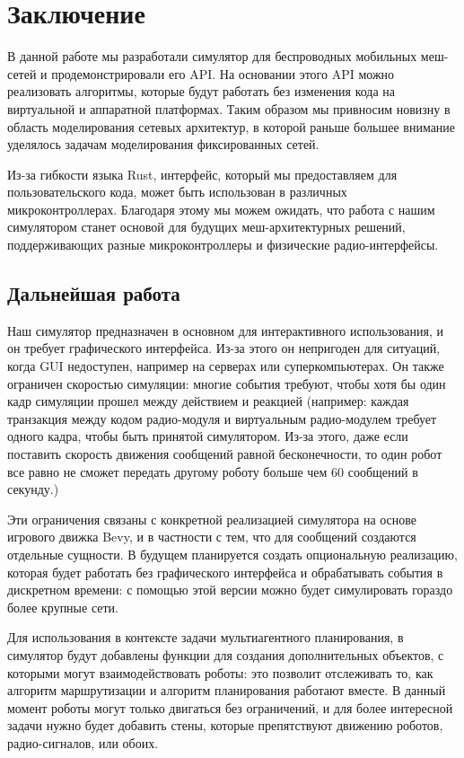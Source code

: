 \documentclass[%
]{report}
\begin{document}
\chapter{Заключение}

В данной работе мы разработали симулятор для беспроводных мобильных меш-сетей
и продемонстрировали его API.
На основании этого API можно реализовать алгоритмы, которые будут
работать без изменения кода на виртуальной и аппаратной платформах.
Таким образом мы привносим новизну в область моделирования сетевых архитектур,
в которой раньше большее внимание уделялось задачам моделирования фиксированных сетей.

Из-за гибкости языка Rust,
интерфейс, который мы предоставляем для пользовательского кода,
может быть использован в различных микроконтроллерах.
Благодаря этому мы можем ожидать,
что работа с нашим симулятором станет основой
для будущих меш-архитектурных решений,
поддерживающих разные микроконтроллеры
и физические радио-интерфейсы.

\section{Дальнейшая работа}

Наш симулятор предназначен в основном для интерактивного использования,
и он требует графического интерфейса.
Из-за этого он непригоден для ситуаций, когда GUI недоступен,
например на серверах или суперкомпьютерах.
Он также ограничен скоростью симуляции:
многие события требуют, чтобы хотя бы один кадр симуляции прошел
между действием и реакцией
(например: каждая транзакция между кодом радио-модуля
и виртуальным радио-модулем
требует одного кадра,
чтобы быть принятой симулятором.
Из-за этого,
даже если поставить скорость движения сообщений равной бесконечности,
то один робот все равно не сможет передать другому роботу
больше чем 60 сообщений в секунду.)

Эти ограничения связаны с конкретной реализацией симулятора
на основе игрового движка Bevy,
и в частности с тем, что для сообщений создаются отдельные сущности.
В будущем планируется создать опциональную реализацию,
которая будет работать без графического интерфейса
и обрабатывать события в дискретном времени:
с помощью этой версии можно будет симулировать гораздо более крупные сети.

Для использования в контексте задачи
мультиагентного планирования,
в симулятор будут добавлены
функции для создания дополнительных объектов,
с которыми могут взаимодействовать роботы:
это позволит отслеживать то,
как алгоритм маршрутизации и алгоритм планирования работают вместе.
В данный момент роботы могут только двигаться без ограничений,
и для более интересной задачи нужно будет добавить стены, которые препятствуют движению роботов,
радио-сигналов, или обоих.
\end{document}
